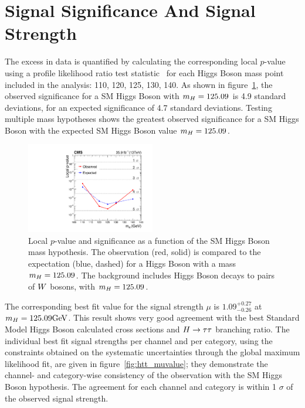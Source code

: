 \section{Signal Significance And Signal Strength}
The excess in data is quantified by calculating the corresponding local $p$-value using a profile likelihood 
ratio test statistic~\cite{LHC-HCG-Report,Chatrchyan:2012tx,Junk,Read:2002hq} for each Higgs Boson mass
point included in the analysis: 110, 120, 125, 130, 140\GeV.
As shown in figure~\ref{fig:htt_pvalue}, the observed significance for a SM Higgs Boson with $m_{H} = 125.09$\GeV 
is 4.9 standard deviations, for an expected significance of 4.7 standard deviations. Testing multiple mass hypotheses
shows the greatest observed significance for a SM Higgs Boson with the expected SM Higgs Boson value
$m_{H} = 125.09$\GeV.

\begin{figure}[!ht]
  \centering
    \includegraphics[width=0.5\textwidth]{higgs_to_taus/plots/Figure_020.pdf}
   \caption{Local ${p}$-value and significance as a function of the SM Higgs Boson mass hypothesis. The 
observation (red, solid) is compared to the expectation (blue, dashed) for a Higgs Boson with a mass 
$m_{H} = 125.09$\GeV. The background includes Higgs Boson decays to pairs of $W$ bosons, with $m_{H} = 125.09$\GeV.}
\label{fig:htt_pvalue}
\end{figure}


The corresponding best fit value for the signal strength $\mu$ is $1.09 ^{+0.27} _{-0.26}$ at $m_{H} = 125.09\mathrm{GeV}$. 
This result shows very good agreement with the best Standard Model Higgs Boson calculated cross sections
and $H\to\tau\tau$ branching ratio.
The individual best fit signal strengths per channel and per category, using the constraints obtained on the 
systematic uncertainties through the global maximum likelihood fit, are given in figure~\ref{fig:htt_muvalue}; they demonstrate 
the channel- and category-wise consistency of the observation with the SM Higgs Boson hypothesis. The agreement
for each channel and category is within 1 $\sigma$ of the observed signal strength.

